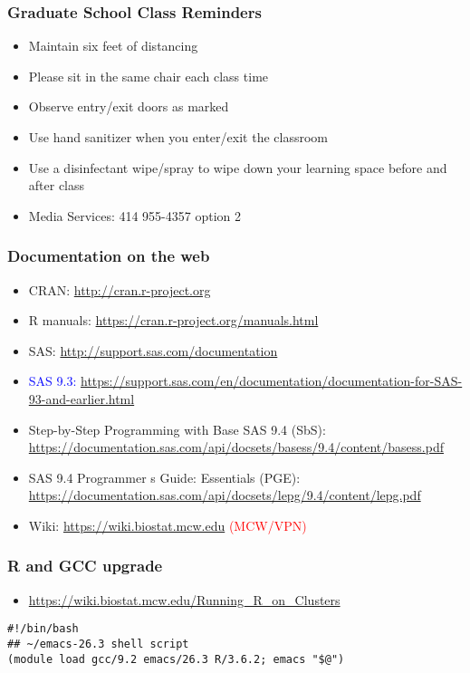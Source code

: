 \documentclass[11pt,pdftex,dvipsnames,usenames,helvetica]{beamer}
\begin{document}
\boldmath

\begin{frame}
\frametitle{Graduate School Class Reminders}

\begin{itemize}
\item Maintain six feet of distancing
\item Please sit in the same chair each class time
\item Observe entry/exit doors as marked
\item Use hand sanitizer when you enter/exit the classroom
\item Use a disinfectant wipe/spray to wipe down your learning space
  before and after class
\item Media Services: 414 955-4357 option 2
\end{itemize}

\end{frame}

\begin{frame}
\frametitle{Documentation on the web}

\begin{itemize}
\item CRAN: \url{http://cran.r-project.org}
\item R manuals: \url{https://cran.r-project.org/manuals.html}
\item SAS: \url{http://support.sas.com/documentation}
\item 
\textcolor{blue}{SAS 9.3: \url{https://support.sas.com/en/documentation/documentation-for-SAS-93-and-earlier.html}}
\item Step-by-Step Programming with Base SAS 9.4 (SbS): \\
\url{https://documentation.sas.com/api/docsets/basess/9.4/content/basess.pdf}
\item SAS 9.4 Programmer s Guide: Essentials (PGE): \\
\url{https://documentation.sas.com/api/docsets/lepg/9.4/content/lepg.pdf}
\item Wiki: \url{https://wiki.biostat.mcw.edu} 
\textcolor{red}{(MCW/VPN)}
\end{itemize}

\end{frame}

\begin{frame}[fragile]
\frametitle{R and GCC upgrade}

\begin{itemize}
\item
\url{https://wiki.biostat.mcw.edu/Running_R_on_Clusters}
\end{itemize}
\begin{verbatim}
#!/bin/bash
## ~/emacs-26.3 shell script 
(module load gcc/9.2 emacs/26.3 R/3.6.2; emacs "$@")
\end{verbatim}

\end{frame}
\end{document}
